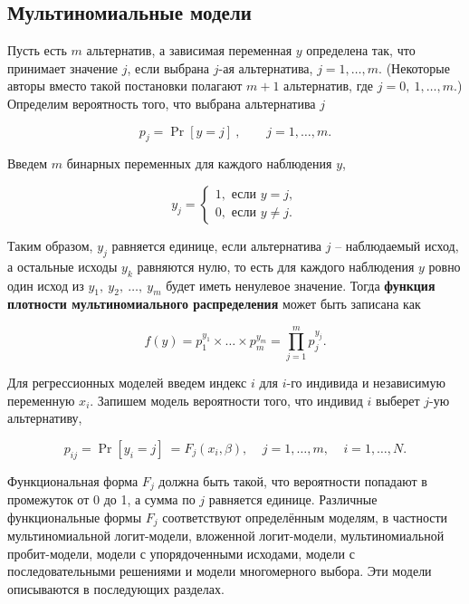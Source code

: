 \subsection{Мультиномиальные модели}

Пусть есть $m$ альтернатив, а зависимая переменная $y$ определена так, что принимает значение $j$, если выбрана $j$-ая альтернатива, $j=1,\dots ,m.$ (Некоторые авторы вместо такой постановки полагают $m+1$ альтернатив, где $j=0,\ 1,\dots ,m.$) Определим вероятность того, что выбрана альтернатива $j$

\begin{equation} 
\label{GrindEQ__15_1_} 
p_j={\Pr  \left[y=j\right]\ },\ \ \ \ \ \ \ \ \ j=1,\dots ,m. 
\end{equation} 

Введем $m$ бинарных переменных для каждого наблюдения $y$,

\begin{equation} \label{GrindEQ__15_2_} 
y_j=\left\{ \begin{array}{c}
1,\text{ если } y=j, \\ 
0,\text{ если } y\ne j. 
\end{array}
\right. 
\end{equation} 

Таким образом, $y_j$ равняется единице, если альтернатива $j$ -- наблюдаемый исход, а остальные исходы $y_k$ равняются нулю, то есть для каждого наблюдения $y$ ровно один исход из $y_1,\ y_2,\ \dots ,\ y_m$ будет иметь ненулевое значение. Тогда \textbf{функция плотности мультиномиального распределения } может быть записана как

\begin{equation} \label{GrindEQ__15_3_} f\left(y\right)=p^{y_1}_1\times \dots \times p^{y_m}_m=\prod^m_{j=1}{p^{y_j}_j}. \end{equation} 

Для регрессионных моделей введем индекс $i$ для $i$-го индивида и независимую переменную $x_i$. Запишем модель вероятности того, что индивид $i$ выберет $j$-ую альтернативу,

\begin{equation} \label{GrindEQ__15_4_} p_{ij}={\Pr  \left[y_i=j\right]\ }=F_j\left(x_i,\beta \right),\ \ \ \ \ j=1,\dots ,m,\ \ \ \ \ i=1,\dots ,N. \end{equation} 

Функциональная форма $F_j$ должна быть такой, что вероятности попадают в промежуток от 0 до 1, а сумма по $j$ равняется единице. Различные функциональные формы $F_j$ соответствуют определённым моделям, в частности мультиномиальной логит-модели, вложенной логит-модели, мультиномиальной пробит-модели, модели с упорядоченными исходами, модели с последовательными решениями и модели многомерного выбора. Эти модели описываются в последующих разделах.

